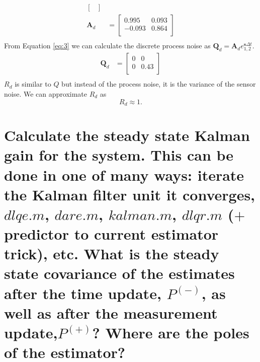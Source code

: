 \documentclass[12pt,letterpaper, onecolumn]{exam}
\begin{document}
\begin{questions}
\begin{parts}
{\begin{equation}
\begin{split}
\begin{bmatrix}
                \end{bmatrix} \\
                \mathbf{A}_d & =
                \begin{bmatrix}
                    0.995  & 0.093 \\
                    -0.093 & 0.864 \\
                \end{bmatrix}\\
            \end{split}
            \label{eq:3}
        \end{equation}
        From Equation \ref{eq:3} we can calculate the discrete process noise as $\mathbf{Q}_d = \mathbf{A}_de^{\mathbf{s}\Delta t}_{1,2}$.
        \begin{equation}
            \begin{split}
                \mathbf{Q}_d & =
                \begin{bmatrix}
                    0 & 0    \\
                    0 & 0.43 \\
                \end{bmatrix} \\
            \end{split}
            \label{eq:4}
        \end{equation}
        $R_d$ is similar to $Q$ but instead of the process noise, it is the variance of the sensor noise. We can approximate $R_d$ as \[R_d \approx 1. \]
        }
        \part{Calculate the steady state Kalman gain for the system. This can be done in one of many ways: iterate the Kalman filter unit it converges, $dlqe.m$, $dare.m$, $kalman.m$, $dlqr.m$ ($+$ predictor to current estimator trick), etc.
            What is the steady state covariance of the estimates after the time update, $P^{(-)}$, as well as after the measurement update,$P^{(+)}$? Where are the poles of the estimator?}


\end{parts}
\end{questions}
\end{document}
